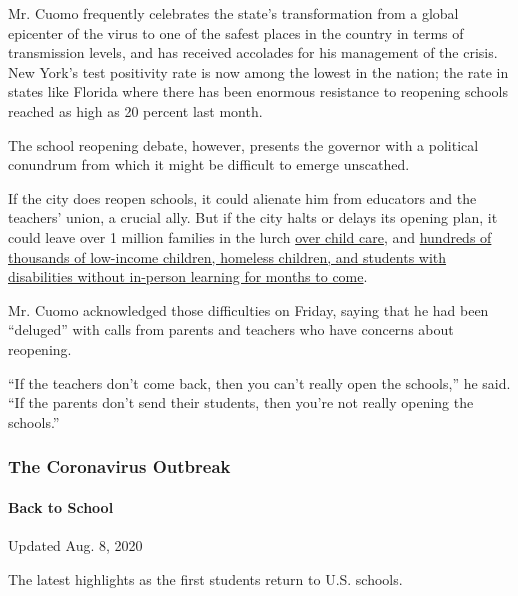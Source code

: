 Mr. Cuomo frequently celebrates the state's transformation from a global
epicenter of the virus to one of the safest places in the country in
terms of transmission levels, and has received accolades for his
management of the crisis. New York's test positivity rate is now among
the lowest in the nation; the rate in states like Florida where there
has been enormous resistance to reopening schools reached as high as 20
percent last month.

The school reopening debate, however, presents the governor with a
political conundrum from which it might be difficult to emerge
unscathed.

If the city does reopen schools, it could alienate him from educators
and the teachers' union, a crucial ally. But if the city halts or delays
its opening plan, it could leave over 1 million families in the lurch
\href{https://www.nytimes.com/2020/07/10/nyregion/nyc-school-daycare-reopening.html}{over
child care}, and
\href{https://www.nytimes.com/2020/04/16/nyregion/special-education-coronavirus-nyc.html}{hundreds
of thousands of low-income children, homeless children, and students
with disabilities without in-person learning for months to come}.

Mr. Cuomo acknowledged those difficulties on Friday, saying that he had
been ``deluged'' with calls from parents and teachers who have concerns
about reopening.

``If the teachers don't come back, then you can't really open the
schools,'' he said. ``If the parents don't send their students, then
you're not really opening the schools.''

\hypertarget{the-coronavirus-outbreak}{%
\subsubsection{The Coronavirus
Outbreak}\label{the-coronavirus-outbreak}}

\hypertarget{back-to-school}{%
\paragraph{Back to School}\label{back-to-school}}

Updated Aug. 8, 2020

The latest highlights as the first students return to U.S. schools.

